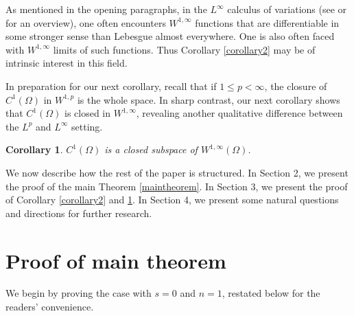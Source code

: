 \documentclass{article}
\newtheorem{corollary}[theorem]{Corollary}
\begin{document}
As mentioned in the opening paragraphs, in the $L^\infty$ calculus of variations (see \cite{viscosity} or \cite{lindqvist2016notes} for an overview), one often encounters $W^{1, \infty}$ functions that are differentiable in some stronger sense than Lebesgue almost everywhere. One is also often faced with $W^{1, \infty}$ limits of such functions. Thus Corollary \ref{corollary2} may be of intrinsic interest in this field.

In preparation for our next corollary, recall that if $1 \leq p < \infty$, the closure of $C^1 (\Omega)$ in $W^{1, p}$ is the whole space. In sharp contrast, our next corollary shows that $C^1 (\Omega)$ is closed in $W^{1, \infty}$, revealing another qualitative difference between the $L^p$ and $L^\infty$ setting.

\begin{corollary}\label{corollary3}
$C^1 (\Omega)$ is a closed subspace of $W^{1, \infty} (\Omega)$.
\end{corollary}
We now describe how the rest of the paper is structured. In Section 2, we present the proof of the main Theorem \ref{maintheorem}. In Section 3, we present the proof of Corollary \ref{corollary2} and \ref{corollary3}. In Section 4, we present some natural questions and directions for further research.

\section{Proof of main theorem}
We begin by proving the case with $s = 0$ and $n = 1$, restated below for the readers' convenience.
\end{document}

